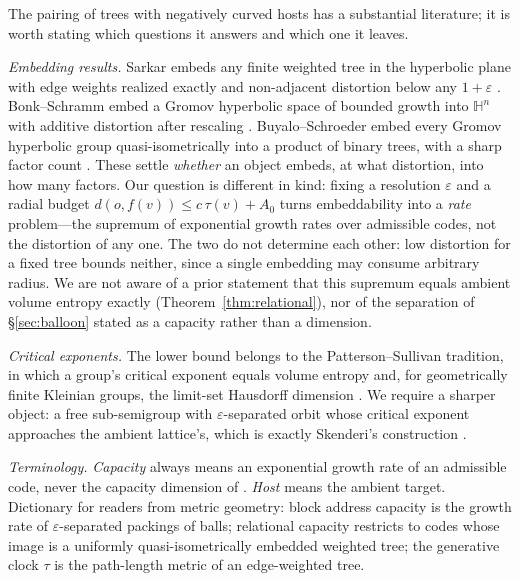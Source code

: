 \documentclass[11pt,reqno]{amsart}
\theoremstyle{plain}
\theoremstyle{definition}
\newcommand{\eps}{\varepsilon}
\begin{document}
The pairing of trees with negatively curved hosts has a substantial literature; it is worth stating which questions it answers and which one it leaves.

\emph{Embedding results.} Sarkar embeds any finite weighted tree in the hyperbolic plane with edge weights realized exactly and non-adjacent distortion below any $1+\eps$ \cite{sarkar2011}. Bonk--Schramm embed a Gromov hyperbolic space of bounded growth into $\mathbb H^n$ with additive distortion after rescaling \cite{bonkschramm2000}. Buyalo--Schroeder embed every Gromov hyperbolic group quasi-isometrically into a product of binary trees, with a sharp factor count \cite{buyaloschroeder2005,buyaloschroeder2007}. These settle \emph{whether} an object embeds, at what distortion, into how many factors. Our question is different in kind: fixing a resolution $\eps$ and a radial budget $d(o,f(v))\le c\,\tau(v)+A_0$ turns embeddability into a \emph{rate} problem---the supremum of exponential growth rates over admissible codes, not the distortion of any one. The two do not determine each other: low distortion for a fixed tree bounds neither, since a single embedding may consume arbitrary radius. We are not aware of a prior statement that this supremum equals ambient volume entropy exactly (Theorem~\ref{thm:relational}), nor of the separation of \S\ref{sec:balloon} stated as a capacity rather than a dimension.

\emph{Critical exponents.} The lower bound belongs to the Patterson--Sullivan tradition, in which a group's critical exponent equals volume entropy and, for geometrically finite Kleinian groups, the limit-set Hausdorff dimension \cite{patterson1976,sullivan1979,bishopjones1997}. We require a sharper object: a free sub-semigroup with $\eps$-separated orbit whose critical exponent approaches the ambient lattice's, which is exactly Skenderi's construction \cite{skenderi2026}.

\emph{Terminology.} \emph{Capacity} always means an exponential growth rate of an admissible code, never the capacity dimension of \cite{buyaloschroeder2005}. \emph{Host} means the ambient target. Dictionary for readers from metric geometry: block address capacity is the growth rate of $\eps$-separated packings of balls; relational capacity restricts to codes whose image is a uniformly quasi-isometrically embedded weighted tree; the generative clock $\tau$ is the path-length metric of an edge-weighted tree.

\end{document}
